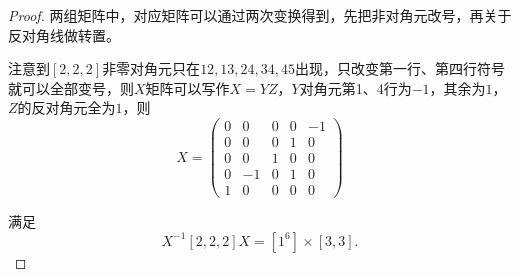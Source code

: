 \documentclass[reqno,a4paper,12pt]{amsart}
\begin{document}
\begin{enumerate}[1.]
\begin{proof}
两组矩阵中，对应矩阵可以通过两次变换得到，先把非对角元改号，再关于反对角线做转置。

注意到$[2,2,2]$非零对角元只在$12,13,24,34,45$出现，只改变第一行、第四行符号就可以全部变号，则$X$矩阵可以写作$X = YZ$，$Y$对角元第1、4行为$-1$，其余为$1$，$Z$的反对角元全为$1$，则
\[
	X = \left( \begin{matrix}
		0 & 0 & 0 & 0 & -1 \\
		0 & 0 & 0 & 1 & 0 \\
		0 & 0 & 1 & 0 & 0 \\
		0 & -1 & 0 & 1 & 0 \\
		1 & 0 & 0 & 0 & 0
	\end{matrix} \right)
\]

满足
\[
	X^{-1} [2,2,2] X = [1^6]\times [3,3].
\]
\end{proof}


\end{enumerate}
\end{document}
